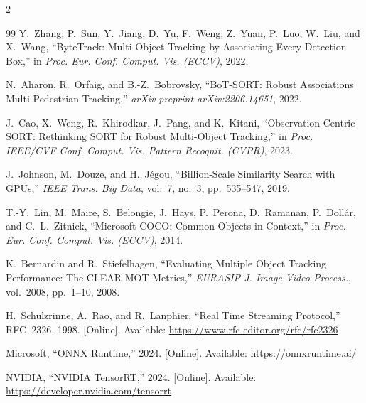 \documentclass[a4paper, twoside, 12pt]{article}
\begin{document}
\begin{multicols}{2}
\begin{thebibliography}{99}
Y.~Zhang, P.~Sun, Y.~Jiang, D.~Yu, F.~Weng, Z.~Yuan, P.~Luo, W.~Liu, and X.~Wang,
``ByteTrack: Multi-Object Tracking by Associating Every Detection Box,''
in \textit{Proc. Eur. Conf. Comput. Vis. (ECCV)}, 2022.

N.~Aharon, R.~Orfaig, and B.-Z.~Bobrovsky,
``BoT-SORT: Robust Associations Multi-Pedestrian Tracking,''
\textit{arXiv preprint arXiv:2206.14651}, 2022.

J.~Cao, X.~Weng, R.~Khirodkar, J.~Pang, and K.~Kitani,
``Observation-Centric SORT: Rethinking SORT for Robust Multi-Object Tracking,''
in \textit{Proc. IEEE/CVF Conf. Comput. Vis. Pattern Recognit. (CVPR)}, 2023.

J.~Johnson, M.~Douze, and H.~J{\'e}gou,
``Billion-Scale Similarity Search with GPUs,''
\textit{IEEE Trans. Big Data}, vol.~7, no.~3, pp.~535--547, 2019.

T.-Y.~Lin, M.~Maire, S.~Belongie, J.~Hays, P.~Perona, D.~Ramanan, P.~Doll{\'a}r, and C.~L.~Zitnick,
``Microsoft COCO: Common Objects in Context,''
in \textit{Proc. Eur. Conf. Comput. Vis. (ECCV)}, 2014.

K.~Bernardin and R.~Stiefelhagen,
``Evaluating Multiple Object Tracking Performance: The CLEAR MOT Metrics,''
\textit{EURASIP J. Image Video Process.}, vol.~2008, pp.~1--10, 2008.

H.~Schulzrinne, A.~Rao, and R.~Lanphier,
``Real Time Streaming Protocol,''
RFC~2326, 1998.
[Online]. Available: \url{https://www.rfc-editor.org/rfc/rfc2326}

Microsoft,
``ONNX Runtime,''
2024.
[Online]. Available: \url{https://onnxruntime.ai/}

NVIDIA,
``NVIDIA TensorRT,''
2024.
[Online]. Available: \url{https://developer.nvidia.com/tensorrt}

\end{thebibliography}
\end{multicols}
\end{document}
